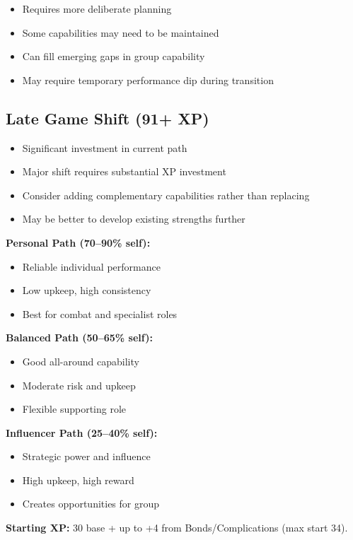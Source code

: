 \documentclass[11pt,twoside,openany]{book}
\begin{document}
\begin{itemize}
\item Requires more deliberate planning
\item Some capabilities may need to be maintained
\item Can fill emerging gaps in group capability
\item May require temporary performance dip during transition
\end{itemize}

\subsection*{Late Game Shift (91+ XP)}

\begin{itemize}
\item Significant investment in current path
\item Major shift requires substantial XP investment
\item Consider adding complementary capabilities rather than replacing
\item May be better to develop existing strengths further
\end{itemize}

\begin{tcolorbox}[colback=gray!5!white, colframe=gray!75!black, title=XP Path Quick Reference, fonttitle=\bfseries,breakable]
\textbf{Personal Path (70--90\% self):}
\begin{itemize}
\item Reliable individual performance
\item Low upkeep, high consistency
\item Best for combat and specialist roles
\end{itemize}

\textbf{Balanced Path (50--65\% self):}
\begin{itemize}
\item Good all-around capability
\item Moderate risk and upkeep
\item Flexible supporting role
\end{itemize}

\textbf{Influencer Path (25--40\% self):}
\begin{itemize}
\item Strategic power and influence
\item High upkeep, high reward
\item Creates opportunities for group
\end{itemize}

\textbf{Starting XP:} 30 base + up to +4 from Bonds/Complications (max start 34).
\end{tcolorbox}
\end{document}
